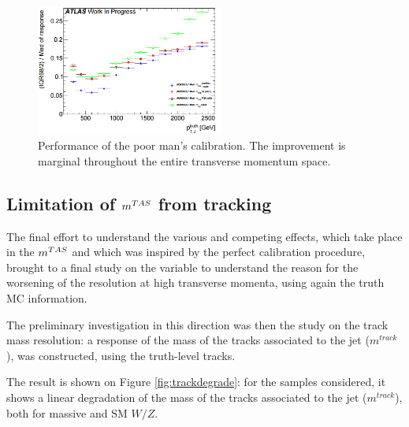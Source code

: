 \begin{figure}[!ht]
  \centering
      \includegraphics[width=0.55\textwidth]{jet_part/calib/perfectcalib4.png}
  \caption[Simple calibration]{Performance of the poor man's calibration. The improvement is marginal throughout the entire transverse momentum space.}
  \label{fig:perfcalib4}
\end{figure}

\subsection{Limitation of $m^{TAS}$ from tracking}
The final effort to understand the various and competing effects, which take place in the $m^{TAS}$ and which was inspired by the perfect calibration procedure, brought to a final study on the variable to understand the reason for the worsening of the resolution at high transverse momenta, using again the truth MC information.

The preliminary investigation in this direction was then the study on the track mass resolution: a response of the mass of the tracks associated to the jet ($m^{track}$), was constructed, using the truth-level tracks.

The result is shown on Figure \ref{fig:trackdegrade}: for the samples considered, it shows a linear degradation of the mass of the tracks associated to the jet ($m^{track}$), both for massive and SM $W/Z$.

